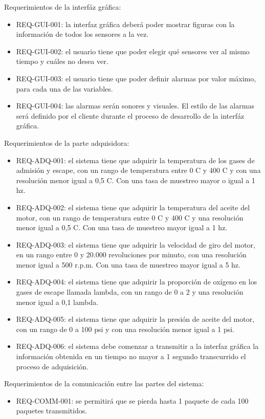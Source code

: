 Requerimientos de la interfáz gráfica:
\begin{itemize}
\item REQ-GUI-001: la interfaz gráfica deberá poder mostrar figuras con la información de todos los sensores a la vez.
\item REQ-GUI-002: el usuario tiene que poder elegir qué sensores ver al mismo tiempo y cuáles no desea ver.
\item REQ-GUI-003: el usuario tiene que poder definir alarmas por valor máximo, para cada una de las variables.
\item REQ-GUI-004: las alarmas serán sonores y visuales. El estilo de las alarmas será definido por el cliente durante el proceso de desarrollo de la interfáz gráfica.
\end{itemize}

Requerimientos de la parte adquisidora:
\begin{itemize}
\item REQ-ADQ-001: el sistema tiene que adquirir la temperatura de los gases de admisión y escape, con un rango de temperatura entre 0 \degree C y 400 \degree C y con una resolución menor igual a 0,5 \degree C. Con una tasa de muestreo mayor o igual a 1 hz.
\item REQ-ADQ-002: el sistema tiene que adquirir la temperatura del aceite del motor, con un rango de temperatura entre 0 \degree C y 400 \degree C y una resolución menor igual a 0,5 \degree C. Con una tasa de muestreo mayor igual a 1 hz.
\item REQ-ADQ-003: el sistema tiene que adquirir la velocidad de giro del motor, en un rango entre 0 y 20.000 revoluciones por minuto, con una resolución menor igual a 500 r.p.m. Con una tasa de muestreo mayor igual a 5 hz.
\item REQ-ADQ-004: el sistema tiene que adquirir la proporción de oxígeno en los gases de escape llamada lambda, con un rango de 0 a 2 y una resolución menor igual a 0,1 lambda.
\item REQ-ADQ-005: el sistema tiene que adquirir la presión de aceite del motor, con un rango de 0 a 100 psi y con una resolución menor igual a 1 psi.
\item REQ-ADQ-006: el sistema debe comenzar a transmitir a la interfaz gráfica la información obtenida en un tiempo no mayor a 1 segundo transcurrido el proceso de adquisición.
\end{itemize}

Requerimientos de la comunicación entre las partes del sistema:
\begin{itemize}
\item REQ-COMM-001: se permitirá que se pierda hasta 1 paquete de cada 100 paquetes transmitidos.
\end{itemize}

